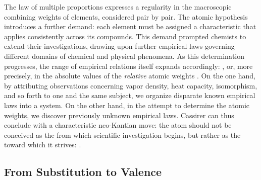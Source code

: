 \documentclass[submitted,12pt]{article}
\begin{document}
The law of multiple proportions expresses a regularity in the macroscopic combining weights of elements, considered pair by pair. The atomic hypothesis introduces a further demand: each element must be assigned a characteristic  that applies consistently across its compounds. This demand prompted chemists to extend their investigations, drawing upon further empirical laws governing different domains of chemical and physical phenomena. As this determination progresses, the range of empirical relations itself expands accordingly: , or, more precisely, in the absolute values of the \emph{relative} atomic weights . On the one hand, by attributing observations concerning vapor density, heat capacity, isomorphism, and so forth to one and the same subject, we organize disparate known empirical laws into a system. On the other hand, in the attempt to determine the atomic weights, we discover previously unknown empirical laws. Cassirer can thus conclude with a characteristic neo-Kantian move: the atom should not be conceived as the  from which scientific investigation begins, but rather as the  toward which it strives:  .  

\subsection{From Substitution to Valence}
\end{document}
